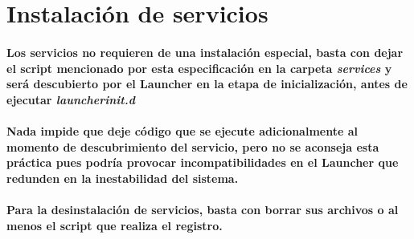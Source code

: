 \documentclass[language=spanish]{article}
\begin{document}
\section{Instalación de servicios}

\paragraph{Los servicios no requieren de una instalación especial, basta con dejar el script mencionado por esta especificación en la carpeta {\em services} y será descubierto por el Launcher en la etapa de inicialización, antes de ejecutar {\em launcherinit.d}}
\paragraph{Nada impide que deje código que se ejecute adicionalmente al momento de descubrimiento del servicio, pero no se aconseja esta práctica pues podría provocar incompatibilidades en el Launcher que redunden en la inestabilidad del sistema.}
\paragraph{Para la desinstalación de servicios, basta con borrar sus archivos o al menos el script que realiza el registro.}
\end{document}
